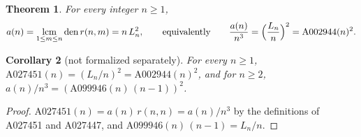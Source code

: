 \documentclass[11pt]{amsart}
\theoremstyle{plain}
\newtheorem{theorem}{Theorem}[section]
\newtheorem{corollary}[theorem]{Corollary}
\theoremstyle{definition}
\DeclareMathOperator{\lcm}{lcm}
\DeclareMathOperator{\den}{den}
\begin{document}
\begin{theorem}\label{thm:main}
For every integer $n\ge1$,
\[
  a(n)=\lcm_{1\le m\le n}\den r(n,m)=n\,L_n^2,
  \qquad\text{equivalently}\qquad
  \frac{a(n)}{n^3}=\Bigl(\frac{L_n}{n}\Bigr)^2=\mathrm{A002944}(n)^2 .
\]
\end{theorem}

\begin{corollary}[not formalized separately]\label{cor:A027451}
For every $n\ge1$, $\mathrm{A027451}(n)=(L_n/n)^2=\mathrm{A002944}(n)^2$, and for $n\ge2$, $a(n)/n^3=(\mathrm{A099946}(n)\,(n-1))^2$.
\end{corollary}

\begin{proof}
$\mathrm{A027451}(n)=a(n)\,r(n,n)=a(n)/n^3$ by the definitions of A027451 and A027447, and $\mathrm{A099946}(n)\,(n-1)=L_n/n$.
\end{proof}
\end{document}
